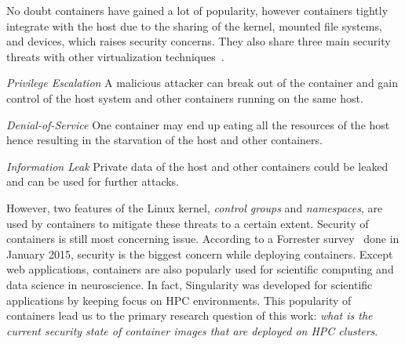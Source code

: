 \documentclass[a4paper,num-refs]{oup-contemporary}
\begin{document}
No doubt containers have gained a lot of popularity, however containers tightly
integrate with the host due to the sharing of the kernel, 
mounted file systems, and devices, which raises security
concerns.
They also share three main security threats with other virtualization
techniques~\cite{gantikow2016providing}.

\textit{Privilege Escalation} A malicious attacker can break out of the container
and gain control of the host system and other containers running on the same host.

\textit{Denial-of-Service} One container may end up eating all the resources of the
host hence resulting in the starvation of the host and other containers.

\textit{Information Leak} Private data of the host and other containers could be
leaked and can be used for further attacks.


However, two features of the Linux kernel, \textit{control groups} and \textit{namespaces},
are used by containers to mitigate these threats to a certain extent. Security
of containers is still most concerning issue. According to a Forrester survey~\cite{bettini2015vulnerability}
done in January 2015, security is the
biggest concern while deploying containers.
Except web applications, containers are also popularly used for scientific computing
and data science in neuroscience. In fact, Singularity was developed for scientific applications
by keeping focus on HPC environments. This popularity of containers lead us to the
primary research question of this work: \textit{what is the current security state of
container images that are deployed on HPC clusters}.
\end{document}
